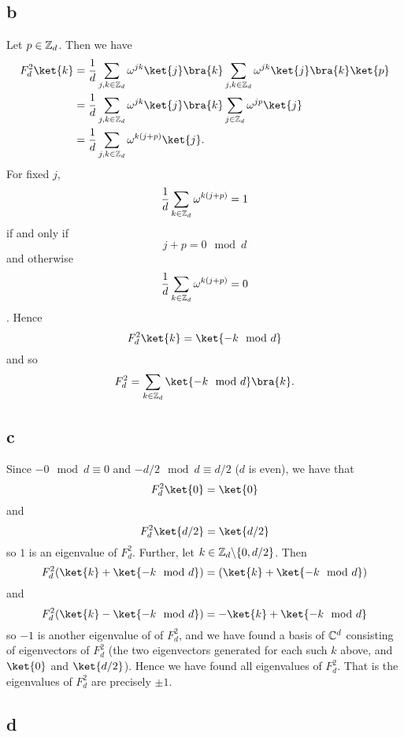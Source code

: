 \documentclass[letterpaper,12pt,oneside,onecolumn]{article}
\begin{document}
\subsection{b}
Let $p \in \mathbb{Z}_d$. Then we have
\begin{align*}
F^2_d\ket{k} &= \frac{1}{d} \sum_{j,k \in \Z_d} \omega^{j k} \ket{j}\bra{k}\sum_{j,k \in \Z_d} \omega^{j k} \ket{j}\bra{k} \ket{p} \\
&= \frac{1}{d} \sum_{j,k \in \Z_d} \omega^{j k} \ket{j}\bra{k}\sum_{j \in \Z_d}\omega^{jp}\ket{j} \\
&=\frac{1}{d} \sum_{j,k \in \Z_d} \omega^{k(j+ p)}\ket{j}.
\end{align*}
For fixed $j$, $$\frac{1}{d} \sum_{k \in \mathbb{Z}_d} \omega^{k(j+p)} = 1$$ if and only if $$j+p = 0 \mod d$$ and otherwise $$\frac{1}{d} \sum_{k \in \mathbb{Z}_d} \omega^{k(j+p)} = 0$$. Hence 
$$F^2_d \ket{k} = \ket{-k \mod d}$$
and so
$$F^2_d = \sum_{k \in \Z_d} \ket{-k \mod d} \bra{k}.$$
\subsection{c}
Since $-0 \mod d \equiv 0$ and $-d/2 \mod d \equiv d/2$ ($d$ is even), we have that
$$F^2_d \ket{0} = \ket{0}$$
and $$F^2_d\ket{d/2} = \ket{d/2}$$
so $1$ is an eigenvalue of $F^2_d$. Further, let $k \in \mathbb{Z}_d \backslash \{0, d/2\}$. Then
$$F^2_d(\ket{k} + \ket{-k \mod d}) = (\ket{k} + \ket{-k \mod d})$$
and
$$F^2_d(\ket{k} - \ket{-k \mod d}) = -\ket{k} + \ket{-k\mod d}$$
so $-1$ is another eigenvalue of of $F^2_d$, and we have found a basis of $\mathbb{C}^d$ consisting of eigenvectors of $F_d^2$ (the two eigenvectors generated for each such $k$ above, and $\ket{0}$ and $\ket{d/2}$). Hence we have found all eigenvalues of $F^2_d$. That is the eigenvalues of $F^2_d$ are precisely $\pm 1$.
\subsection{d}
\end{document}
